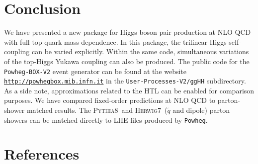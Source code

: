 \documentclass[a4paper]{jpconf}
\newcommand{\pythia}{\textsc{Pythia8}}
\newcommand{\herwig}{\textsc{Herwig7}}
\begin{document}
\section{Conclusion}

We have presented a new package for Higgs boson pair production at NLO QCD with full top-quark mass dependence. In this package, the trilinear Higgs self-coupling can be varied explicitly. Within the same code, simultaneous variations of the top-Higgs Yukawa coupling can also be produced. The public code for the \texttt{Powheg-BOX-V2} event generator can be found at the website \href{http://powhegbox.mib.infn.it}{\tt http://powhegbox.mib.infn.it} in the {\tt User-Processes-V2/ggHH} subdirectory. As a side note, approximations related to the HTL can be enabled for comparison purposes. We have compared fixed-order predictions at NLO QCD to parton-shower matched results. The \pythia~and \herwig~($\tilde{q}$ and dipole) parton showers can be matched directly to LHE files produced by \texttt{Powheg}.



\section*{References}


{}
\end{document}
